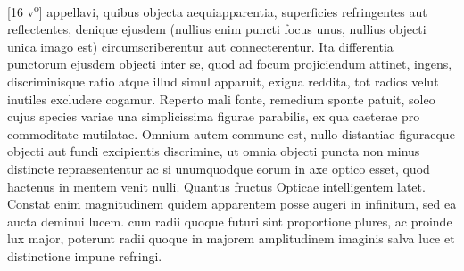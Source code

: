 [16 v\textsuperscript{o}]  appellavi, quibus objecta aequiapparentia, superficies  refringentes aut reflectentes, denique  ejusdem  (nullius enim puncti focus\protect{} unus, nullius objecti unica imago est) circumscriberentur aut connecterentur. Ita differentia punctorum ejusdem objecti inter se, quod ad focum\protect{} projiciendum attinet, ingens, discriminisque ratio atque illud simul apparuit,  exigua reddita, tot radios velut inutiles excludere cogamur. \pend \pstart  Reperto mali fonte, remedium sponte patuit, \protect{}soleo  cujus species variae una simplicissima figurae  parabilis, ex qua caeterae pro commoditate mutilatae. \pend \pstart   Omnium autem commune est, nullo distantiae figuraeque objecti aut fundi excipientis discrimine, ut omnia objecti puncta non minus distincte repraesententur ac si unumquodque eorum in axe optico \protect{} esset, quod hactenus in mentem venit nulli. \pend \pstart  Quantus  fructus  Opticae intelligentem latet. Constat enim magnitudinem quidem apparentem posse  augeri in infinitum, sed ea aucta deminui lucem\protect{}.  cum radii quoque futuri sint proportione plures, ac proinde lux\protect{} major, poterunt radii quoque in majorem amplitudinem imaginis salva luce\protect{} et distinctione impune refringi. \pend 